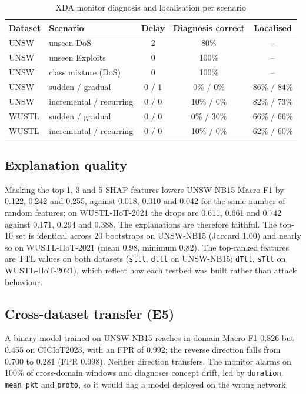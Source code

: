\documentclass[conference]{IEEEtran}
\begin{document}
\begin{table}[t]
\caption{XDA monitor diagnosis and localisation per scenario}
\label{tab:diag}
\centering\footnotesize
\begin{tabular}{@{}llccc@{}}
\toprule
Dataset & Scenario & Delay & Diagnosis correct & Localised \\
\midrule
UNSW & unseen DoS & 2 & 80\% & -- \\
UNSW & unseen Exploits & 0 & 100\% & -- \\
UNSW & class mixture (DoS) & 0 & 100\% & -- \\
UNSW & sudden / gradual & 0 / 1 & 0\% / 0\% & 86\% / 84\% \\
UNSW & incremental / recurring & 0 / 0 & 10\% / 0\% & 82\% / 73\% \\
WUSTL & sudden / gradual & 0 / 0 & 0\% / 30\% & 66\% / 66\% \\
WUSTL & incremental / recurring & 0 / 0 & 10\% / 0\% & 62\% / 60\% \\
\bottomrule
\end{tabular}
\end{table}

\subsection{Explanation quality}
Masking the top-1, 3 and 5 SHAP features lowers UNSW-NB15 Macro-F1 by 0.122, 0.242 and 0.255, against 0.018, 0.010 and 0.042 for the same number of random features; on WUSTL-IIoT-2021 the drops are 0.611, 0.661 and 0.742 against 0.171, 0.294 and 0.388. The explanations are therefore faithful. The top-10 set is identical across 20 bootstraps on UNSW-NB15 (Jaccard 1.00) and nearly so on WUSTL-IIoT-2021 (mean 0.98, minimum 0.82). The top-ranked features are TTL values on both datasets (\texttt{sttl}, \texttt{dttl} on UNSW-NB15; \texttt{dTtl}, \texttt{sTtl} on WUSTL-IIoT-2021), which reflect how each testbed was built rather than attack behaviour.

\subsection{Cross-dataset transfer (E5)}
A binary model trained on UNSW-NB15 reaches in-domain Macro-F1 0.826 but 0.455 on CICIoT2023, with an FPR of 0.992; the reverse direction falls from 0.700 to 0.281 (FPR 0.998). Neither direction transfers. The monitor alarms on 100\% of cross-domain windows and diagnoses concept drift, led by \texttt{duration}, \texttt{mean\_pkt} and \texttt{proto}, so it would flag a model deployed on the wrong network.
\end{document}
